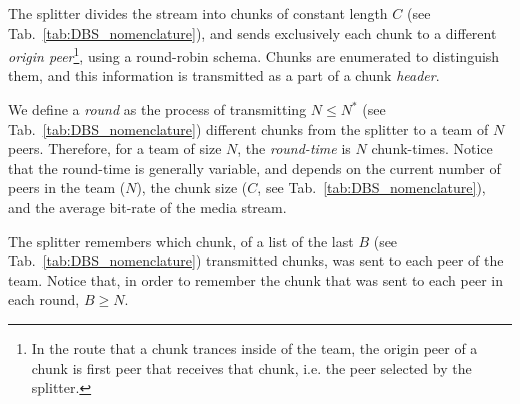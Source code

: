 
\label{sec:feeding_the_team}

The splitter divides the stream into chunks of constant length $C$
(see Tab.~\ref{tab:DBS_nomenclature}), and sends exclusively each
chunk to a different \emph{origin peer}\footnote{In the route that a
  chunk trances inside of the team, the origin peer of a chunk is
  first peer that receives that chunk, i.e. the peer selected by the
  splitter.}, using a round-robin schema. Chunks are enumerated to
distinguish them, and this information is transmitted as a part of a
chunk \emph{header}.

\begin{comment}
More details about the implementation
are available in Fig.~\ref{fig:chunk_generation}.


\begin{figure*}
  \fig{500}{5cm}{DBS_splitter_feed} \caption{Chunk
    generation at the splitter and their transmission to the
    team.\label{fig:chunk_generation}}
\end{figure*}
\end{comment}

We define a \emph{round} as the process of transmitting $N\leq N^*$
(see Tab.~\ref{tab:DBS_nomenclature}) different chunks from the
splitter to a team of $N$ peers. Therefore, for a team of size $N$,
the \emph{round-time} is $N$ chunk-times. Notice that the round-time
is generally variable, and depends on the current number of peers in
the team ($N$), the chunk size ($C$, see
Tab.~\ref{tab:DBS_nomenclature}), and the average bit-rate of the
media stream.

The splitter remembers which chunk, of a list of the last $B$ (see
Tab.~\ref{tab:DBS_nomenclature}) transmitted chunks, was sent to each
peer of the team. Notice that, in order to remember the chunk that was
sent to each peer in each round, $B\ge N$. 

\begin{comment}
(in a team) as the time necessary to send two consecutive chunks from
  the splitter (of such team) to the same peer, using the
  round-robing. This time is variable and depends on $|T|$, $C$, and
  the average bit-rate of the media, $A$.
\end{comment}

